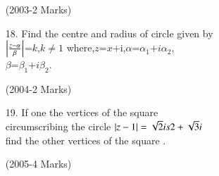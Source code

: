 \documentclass[journal,12pt,twocolumn]{IEEEtran}
\theoremstyle{remark}
\begin{document}
\begin{enumerate}
   \hfill (2003-2 Marks)\\
\item[18.] Find the centre and radius  of circle given by\\
    $\left\vert\frac{z-\alpha} \beta\right\vert$=$k$,$k\not=1$ 
where,$z$=$x$+i,$\alpha$=$\alpha_1$+$i\alpha_2$, \\
    $\beta$=$\beta_1$+$i\beta_2$. 
    
    \hfill(2004-2 Marks) \\
      
\item[19.] If one the vertices of the square \\
circumscribing the circle $\left\vert z-1\right\vert = \sqrt{2} is 2 +\sqrt{3} i $ \\
      
      
find the other vertices of the square .

\hfill (2005-4 Marks) \\

\end{enumerate}
\end{document}
